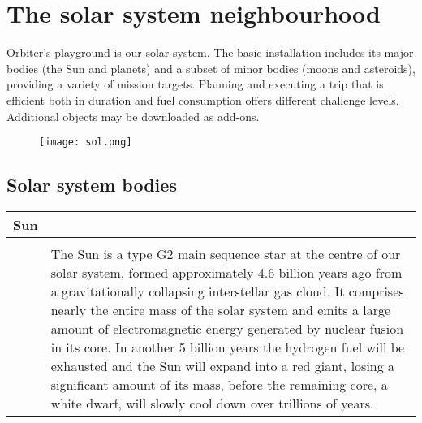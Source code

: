 \documentclass[Orbiter User Manual.tex]{subfiles}
\begin{document}
\section{The solar system neighbourhood}
Orbiter's playground is our solar system. The basic installation includes its major bodies (the Sun and planets) and a subset of minor bodies (moons and asteroids), providing a variety of mission targets. Planning and executing a trip that is efficient both in duration and fuel consumption offers different challenge levels. Additional objects may be downloaded as add-ons.

\begin{figure}[H]
	\centering
	\texttt{[image: sol.png]}
\end{figure}


\subsection{Solar system bodies}

\begin{table}[H]
	\begin{tabularx}{\textwidth}{ |lX| }
	\hline\rule{0pt}{2ex}
	\textbf{Sun} &\\
	\hline\rule{0pt}{2ex}
	\adjustbox{valign=t}{
		\begin{tabular}{ c }
		\texttt{[image: solsys\_sun.jpg]}\\
		\end{tabular}
		}
	& \vfill
	The Sun is a type G2 main sequence star at the centre of our solar system, formed approximately 4.6 billion years ago from a gravitationally collapsing interstellar gas cloud. It comprises nearly the entire mass of the solar system and emits a large amount of electromagnetic energy generated by nuclear fusion in its core. In another 5 billion years the hydrogen fuel will be exhausted and the Sun will expand into a red giant, losing a significant amount of its mass, before the remaining core, a white dwarf, will slowly cool down over trillions of years.\\
	\hline
	\end{tabularx}
\end{table}
\end{document}
